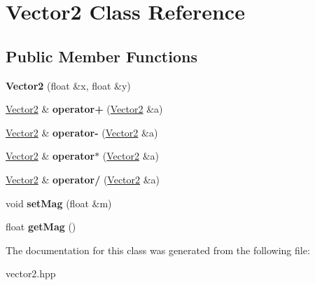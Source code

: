\hypertarget{classVector2}{\section{Vector2 Class Reference}
\label{classVector2}
}
\subsection*{Public Member Functions}
\begin{DoxyCompactItemize}
\item 
\hypertarget{classVector2_aff0bfd34d2b7efc7580b0c095cc8a030}{{\bfseries Vector2} (float \&x, float \&y)}\label{classVector2_aff0bfd34d2b7efc7580b0c095cc8a030}

\item 
\hypertarget{classVector2_a99de0abd6ae47e266d1b54814d45ad95}{\hyperlink{classVector2}{Vector2} \& {\bfseries operator+} (\hyperlink{classVector2}{Vector2} \&a)}\label{classVector2_a99de0abd6ae47e266d1b54814d45ad95}

\item 
\hypertarget{classVector2_ab3c98730ef5c1311fdb2850f2ed19568}{\hyperlink{classVector2}{Vector2} \& {\bfseries operator-\/} (\hyperlink{classVector2}{Vector2} \&a)}\label{classVector2_ab3c98730ef5c1311fdb2850f2ed19568}

\item 
\hypertarget{classVector2_a7e22863a9cdb5419a1f9d3cdb8999b7e}{\hyperlink{classVector2}{Vector2} \& {\bfseries operator$\ast$} (\hyperlink{classVector2}{Vector2} \&a)}\label{classVector2_a7e22863a9cdb5419a1f9d3cdb8999b7e}

\item 
\hypertarget{classVector2_a82e2189a023d545944ae16b79a58fdde}{\hyperlink{classVector2}{Vector2} \& {\bfseries operator/} (\hyperlink{classVector2}{Vector2} \&a)}\label{classVector2_a82e2189a023d545944ae16b79a58fdde}

\item 
\hypertarget{classVector2_accf551783819595aa47205ea86531d69}{void {\bfseries set\-Mag} (float \&m)}\label{classVector2_accf551783819595aa47205ea86531d69}

\item 
\hypertarget{classVector2_a64b118693e367eb938a198649ac95c63}{float {\bfseries get\-Mag} ()}\label{classVector2_a64b118693e367eb938a198649ac95c63}

\end{DoxyCompactItemize}


The documentation for this class was generated from the following file\-:\begin{DoxyCompactItemize}
\item 
vector2.\-hpp\end{DoxyCompactItemize}
